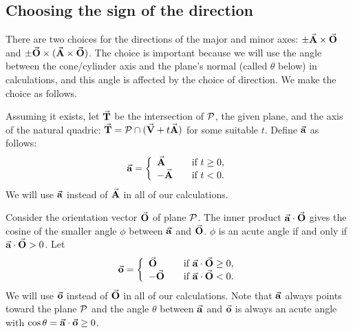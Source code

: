 
\subsection{Choosing the sign of the direction}
\label{section:sign}

There are two choices for the directions of the major and minor axes:
$\pm \vec{\bf A}\times\vec{\bf O}$ and
$\pm \vec{\bf O}\times(\vec{\bf A}\times\vec{\bf O})$.
The choice is important because we will use the angle between the 
cone/cylinder axis and the plane's normal 
(called $\theta$ below) in calculations, 
and this angle is affected by the choice of direction.
We make the choice as follows.

     Assuming it exists, let $\vec{\bf T}$ be the intersection of ${\cal P}$,
the given plane, and the axis of the natural quadric: 
$\vec{\bf T}={\cal P}\cap (\vec{\bf V}+t\vec{\bf A})$ for some suitable $t$.  
Define $\vec{\bf a}$ as follows:
\[ \vec{\bf a} = \left\{
                    \begin{array}{lll}
                         \vec{\bf A} & & \mbox{if $t\geq 0$,} \\
                         -\vec{\bf A} & & \mbox{if $t< 0$.}
                    \end{array} \right. \]
We will use $\vec{\bf a}$ instead of $\vec{\bf A}$ in all of our calculations.

     Consider the orientation vector $\vec{\bf O}$ of plane ${\cal P}$.
The inner product $\vec{\bf a}\cdot\vec{\bf O}$ gives the cosine of the smaller
angle $\phi$ between $\vec{\bf a}$ and $\vec{\bf O}$.  $\phi$ is an acute angle
if and only if $\vec{\bf a}\cdot\vec{\bf O}>0$.  Let
\[ \vec{\bf o} = \left\{
                    \begin{array}{lll}
                     \vec{\bf O} & & \mbox{if $\vec{\bf a}\cdot\vec{\bf O}\geq 0$,}\\
                     -\vec{\bf O} & & \mbox{if $\vec{\bf a}\cdot\vec{\bf O}< 0$.}
                    \end{array} \right. \]
We will use $\vec{\bf o}$ instead of $\vec{\bf O}$ in all of our calculations.
Note that $\vec{\bf a}$ always points toward the plane ${\cal P}$ and 
the angle $\theta$ between $\vec{\bf a}$ and $\vec{\bf o}$ is always
an acute angle with $\cos\theta=\vec{\bf a}\cdot\vec{\bf o}\geq 0$.

